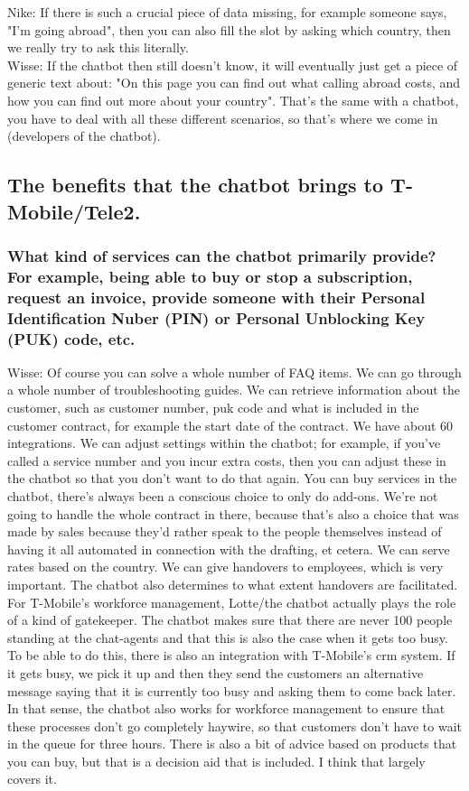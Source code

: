 \begin{appendices}
	\break
	Nike: If there is such a crucial piece of data missing, for example someone says, "I'm going abroad", then you can also fill the slot by asking which country, then we really try to ask this literally.\\
	\break
	Wisse: If the chatbot then still doesn't know, it will eventually just get a piece of generic text about: "On this page you can find out what calling abroad costs, and how you can find out more about your country". That's the same with a chatbot, you have to deal with all these different scenarios, so that's where we come in (developers of the chatbot).
	
	\subsection{The benefits that the chatbot brings to T-Mobile/Tele2.}
	\subsubsection{What kind of services can the chatbot primarily provide? For example,
		being able to buy or stop a subscription, request an invoice, provide someone
		with their Personal Identification Nuber (PIN) or Personal Unblocking Key
		(PUK) code, etc.}
	Wisse: Of course you can solve a whole number of FAQ items. We can go through a whole number of troubleshooting guides. We can retrieve information about the customer, such as customer number, puk code and what is included in the customer contract, for example the start date of the contract. We have about 60 integrations. We can adjust settings within the chatbot; for example, if you've called a service number and you incur extra costs, then you can adjust these in the chatbot so that you don't want to do that again. You can buy services in the chatbot, there's always been a conscious choice to only do add-ons. We're not going to handle the whole contract in there, because that's also a choice that was made by sales because they'd rather speak to the people themselves instead of having it all automated in connection with the drafting, et cetera. We can serve rates based on the country. We can give handovers to employees, which is very important. The chatbot also determines to what extent handovers are facilitated. For T-Mobile's workforce management, Lotte/the chatbot actually plays the role of a kind of gatekeeper. The chatbot makes sure that there are never 100 people standing at the chat-agents and that this is also the case when it gets too busy. To be able to do this, there is also an integration with T-Mobile's \acrfull{crm} system. If it gets busy, we pick it up and then they send the customers an alternative message saying that it is currently too busy and asking them to come back later. In that sense, the chatbot also works for workforce management to ensure that these processes don't go completely haywire, so that customers don't have to wait in the queue for three hours. There is also a bit of advice based on products that you can buy, but that is a decision aid that is included. I think that largely covers it.
	

\end{appendices}
